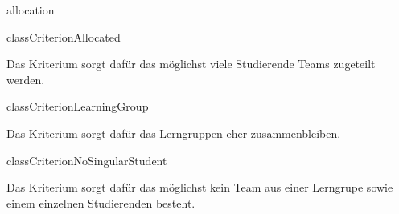 \begin{texdocpackage}{allocation}
\begin{texdocclass}{class}{CriterionAllocated}
\label{texdoclet:allocation.CriterionAllocated}
\begin{texdocclassintro}
Das Kriterium sorgt dafür das möglichst viele Studierende Teams zugeteilt
 werden.\end{texdocclassintro}
\begin{texdocclassconstructors}
\end{texdocclassconstructors}
\begin{texdocclassmethods}
\end{texdocclassmethods}
\end{texdocclass}


\begin{texdocclass}{class}{CriterionLearningGroup}
\label{texdoclet:allocation.CriterionLearningGroup}
\begin{texdocclassintro}
Das Kriterium sorgt dafür das Lerngruppen eher zusammenbleiben.\end{texdocclassintro}
\begin{texdocclassconstructors}
\end{texdocclassconstructors}
\begin{texdocclassmethods}
\end{texdocclassmethods}
\end{texdocclass}


\begin{texdocclass}{class}{CriterionNoSingularStudent}
\label{texdoclet:allocation.CriterionNoSingularStudent}
\begin{texdocclassintro}
Das Kriterium sorgt dafür das möglichst kein Team aus einer Lerngrupe sowie
 einem einzelnen Studierenden besteht.\end{texdocclassintro}
\begin{texdocclassconstructors}
\end{texdocclassconstructors}
\begin{texdocclassmethods}
\end{texdocclassmethods}
\end{texdocclass}



\end{texdocpackage}
